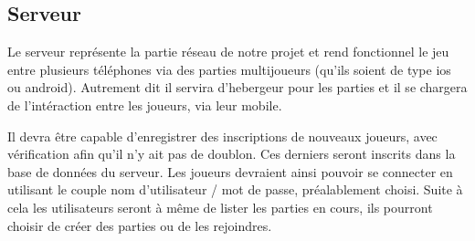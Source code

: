 \subsection{Serveur}
	
	Le serveur représente la partie réseau de notre projet et rend fonctionnel le jeu entre plusieurs téléphones via des parties multijoueurs (qu'ils soient de type
	\gls{ios} ou \gls{android}). Autrement dit il servira d'hebergeur pour les parties et
	il se chargera de l'intéraction entre les joueurs, via leur mobile.
	
	Il devra être capable d'enregistrer des inscriptions de nouveaux joueurs, avec
	vérification afin qu'il n'y ait pas de doublon. Ces derniers seront inscrits dans 
	la base de données du serveur. Les joueurs devraient ainsi
	pouvoir se connecter en utilisant le couple nom d'utilisateur / mot de passe,
	préalablement choisi. Suite à cela les utilisateurs seront à même de lister
	les parties en cours, ils pourront choisir de créer des parties ou de les rejoindres.